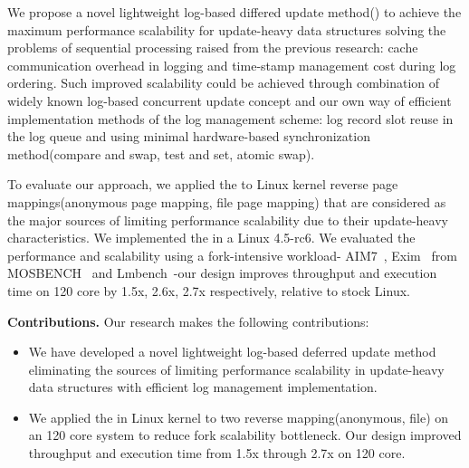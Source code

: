 %
We propose a novel lightweight log-based differed update method(\LDU) to achieve 
the maximum performance scalability for update-heavy data structures solving the 
problems of sequential processing raised from the previous research:
cache communication overhead in logging and time-stamp management cost during log
ordering. 
Such improved scalability could be achieved through combination of widely known 
log-based concurrent update concept and our own way of efficient implementation
methods of the log management scheme: log record slot reuse in the log queue and 
using minimal hardware-based synchronization
method(compare and swap, test and set, atomic swap).


To evaluate our approach, we applied the \LDU to Linux kernel reverse
page mappings(anonymous page mapping, file page mapping) that are considered as
the major sources of limiting performance scalability due to their 
update-heavy characteristics.
We implemented the \LDU in a Linux 4.5-rc6.
We evaluated the performance and scalability using a fork-intensive workload-
AIM7~\cite{AIM7Benchmark}, Exim~\cite{Exim} from MOSBENCH~\cite{MOSBENCH}
and Lmbench~\cite{mcvoy1996lmbench}-our design improves throughput and execution
time on 120 core by 1.5x, 2.6x, 2.7x respectively, relative to stock Linux.


\textbf{Contributions.} Our research makes the following contributions:
\begin{itemize}
\item We have developed a novel lightweight log-based deferred update method
eliminating the sources of limiting performance scalability in update-heavy data
structures with efficient log management implementation.
\item 
We applied the \LDU in Linux kernel to two reverse mapping(anonymous, file) on
an 120 core system to reduce fork scalability bottleneck.
Our design improved throughput and execution time from 1.5x through 2.7x on 120 core.
\end{itemize}

